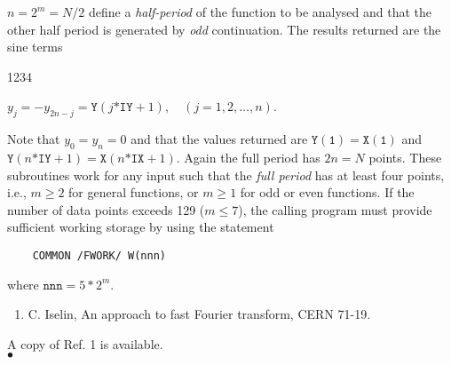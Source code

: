 $n=2^m=N/2$ define a  {\it half-period} of the function to be
analysed and that the other half period is generated by {\it odd}
continuation. The results returned are the sine terms
\begin{DLtt}{1234}
\item $y_j=-y_{2n-j}=\mathtt{Y}(j\mathtt{*IY}+1), \quad
(j=1,2,\ldots,n)$.
\end{DLtt}
Note that $y_0=y_n=0$ and that the values returned are
$\mathtt{Y(1)=X(1)}$ and $\mathtt{Y}(n\mathtt{*IY}+1)=
\mathtt{X}(n\mathtt{*IX}+1)$.
Again the full period has $2n=N$ points.
\Restrict
These subroutines work for any input such that the {\it full period}
has at least four points, i.e., $m\geq 2$ for general
functions, or $m\geq 1$ for odd or even functions. If the number of
data points exceeds 129 ($ m\leq 7$), the calling program must provide
sufficient working storage by using the statement
\begin{verbatim}
    COMMON /FWORK/ W(nnn)
\end{verbatim}
where $\mathtt{nnn}=5*2^m$.
\Refer
\begin{enumerate}
\item C. Iselin, An approach to fast Fourier transform, CERN 71-19.
\end{enumerate}
 A copy of Ref. 1 is available.
\\ $\bullet$
